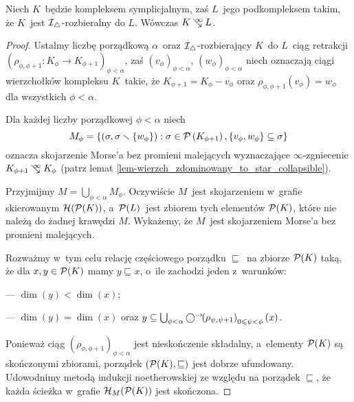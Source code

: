 \begin{lem}\label{lem-I-rozb_to_zgniatalne}
Niech $K$~będzie kompleksem symplicjalnym, zaś $L$~jego podkompleksem takim, że $K$~jest $\mathcal{I}_\triangle$-rozbieralny do $L$. Wówczas $K\infcoll L$.
\end{lem}
\begin{proof}
Ustalmy liczbę porządkową $\alpha$~oraz $\mathcal{I}_\triangle$-rozbierający $K$~do $L$~ciąg retrakcji $\left(\rho_{\phi,\phi+1}\colon K_{\phi}\to K_{\phi+1}\right)_{\phi<\alpha}$, zaś $\left(v_\phi\right)_{\phi<\alpha}$, $\left(w_\phi\right)_{\phi<\alpha}$ niech oznaczają ciągi wierzchołków kompleksu $K$~takie, że $K_{\phi+1}=K_{\phi}-v_{\phi}$ oraz $\rho_{\phi,\phi+1}\left(v_\phi\right)=w_{\phi}$ dla wszystkich $\phi<\alpha$. 

Dla każdej liczby porządkowej $\phi<\alpha$ niech \[M_\phi=\left\{\left(\sigma,\sigma\smallsetminus\left\{w_\phi\right\}\right):\sigma\in \mathcal{P}\left(K_{\phi+1}\right), \left\{v_\phi,w_\phi\right\}\subseteq\sigma\right\}\] oznacza skojarzenie Morse'a bez promieni malejących wyznaczające \mbox{$\infty$-zgniecenie} $K_{\phi+1}\infcoll K_{\phi}$ (patrz lemat \ref{lem-wierzch_zdominowany_to_star_collapsible}).

Przyjmijmy $M=\bigcup_{\phi<\alpha} M_\phi$. Oczywiście $M$~jest skojarzeniem w~grafie skierowanym $\mathcal{H}(\mathcal{P}(K))$, a~$\mathcal{P}(L)$~jest zbiorem tych elementów $\mathcal{P}(K)$, które nie należą do żadnej krawędzi $M$. Wykażemy, że $M$~jest skojarzeniem Morse'a bez promieni malejących. 

Rozważmy w~tym celu relację częściowego porządku $\sqsubseteq$~na zbiorze $\mathcal{P}(K)$ taką, że dla $x,y\in\mathcal{P}(K)$ mamy $y\sqsubseteq x$, o~ile zachodzi jeden z~warunków:
\begin{compactitem}
\item[---]$\dim(y)< \dim(x)$;
\item[---]$\dim(y)=\dim(x)$ oraz $y\subseteq \bigcup_{\phi<\alpha} \bigcirc^\rightarrow\!\!\left(\rho_{\psi,\psi+1}\right)_{0\leqslant\psi<\phi}(x)$.
\end{compactitem}
Ponieważ ciąg $\left(\rho_{\phi,\phi+1}\right)_{\phi<\alpha}$ jest nieskończenie składalny, a~elementy $\mathcal{P}(K)$ są skończonymi zbiorami, porządek $(\mathcal{P}(K),\sqsubseteq)$ jest dobrze ufundowany. Udowodnimy metodą indukcji noetherowskiej ze względu na porządek $\sqsubseteq$, że każda ścieżka w~grafie $\mathcal{H}_M(\mathcal{P}(K))$ jest skończona.


\end{proof}
